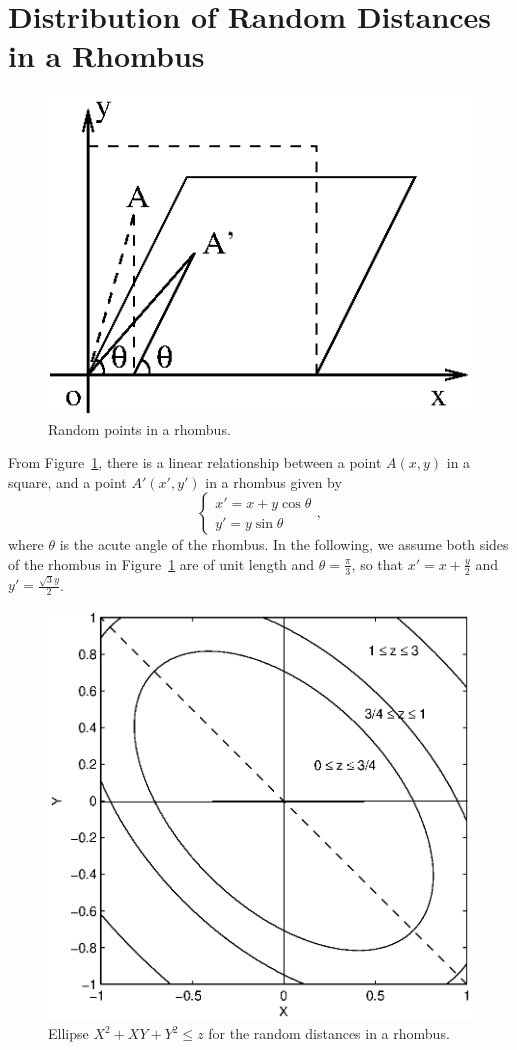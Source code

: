 \documentclass[12pt,draftclsnofoot,onecolumn]{IEEEtran}
\begin{document}
\section{Distribution of Random Distances in a Rhombus}

\begin{figure}
  \centering
  \includegraphics[width=0.4\columnwidth]{fig/single_rhombus}
  \caption{Random points in a rhombus.}
  \label{fig:rhombus}
\end{figure}

From Figure~\ref{fig:rhombus}, there is a linear relationship between a point $A
(x,y)$ in a square, and a point $A' (x',y')$ in a rhombus given by
\begin{equation}\label{eq:xr}
 \left\{
\begin{array}{lc}
x'=x+y\cos \theta \\
y'=y \sin \theta
\end{array}
\right.,
\end{equation}
where $\theta$ is the acute angle of the rhombus. In the following, we
assume both sides of the rhombus in Figure~\ref{fig:rhombus} are of unit
length and $\theta=\frac{\pi}{3}$, so that $x'=x+\frac{y}{2}$ and $y'=\frac{\sqrt{3}y}{2}$.

\begin{figure}
  \centering
  \includegraphics[width=0.5\columnwidth]{fig/rhombus_within}
  \caption{Ellipse $X^2+XY+Y^2 \leq z$ for the random distances in a rhombus.}
  \label{fig:z1}
\end{figure}
\end{document}

